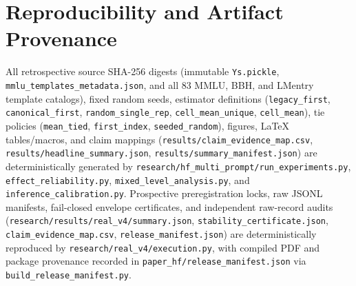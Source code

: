 \documentclass[11pt,a4paper]{article}
\begin{document}



\appendix
\section{Reproducibility and Artifact Provenance}
{\raggedright
All retrospective source SHA-256 digests (immutable \nolinkurl{Ys.pickle}, \nolinkurl{mmlu_templates_metadata.json}, and all 83 MMLU, BBH, and LMentry template catalogs), fixed random seeds, estimator definitions (\nolinkurl{legacy_first}, \nolinkurl{canonical_first}, \nolinkurl{random_single_rep}, \nolinkurl{cell_mean_unique}, \nolinkurl{cell_mean}), tie policies (\nolinkurl{mean_tied}, \nolinkurl{first_index}, \nolinkurl{seeded_random}), figures, LaTeX tables/macros, and claim mappings (\nolinkurl{results/claim_evidence_map.csv}, \nolinkurl{results/headline_summary.json}, \nolinkurl{results/summary_manifest.json}) are deterministically generated by \nolinkurl{research/hf_multi_prompt/run_experiments.py}, \nolinkurl{effect_reliability.py}, \nolinkurl{mixed_level_analysis.py}, and \nolinkurl{inference_calibration.py}. Prospective preregistration locks, raw JSONL manifests, fail-closed envelope certificates, and independent raw-record audits (\nolinkurl{research/results/real_v4/summary.json}, \nolinkurl{stability_certificate.json}, \nolinkurl{claim_evidence_map.csv}, \nolinkurl{release_manifest.json}) are deterministically reproduced by \nolinkurl{research/real_v4/execution.py}, with compiled PDF and package provenance recorded in \nolinkurl{paper_hf/release_manifest.json} via \nolinkurl{build_release_manifest.py}.\par}
\end{document}
